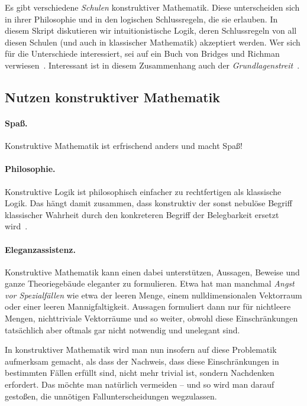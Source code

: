 \documentclass[a4paper,ngerman,12pt]{scrartcl}
\theoremstyle{definition}
\theoremstyle{plain}
\theoremstyle{remark}
\renewcommand{\_}{\mathpunct{.}\,}
\newcommand{\?}{\,{:}\,}
\begin{document}
Es gibt verschiedene \emph{Schulen} konstruktiver Mathematik. Diese
unterscheiden sich in ihrer Philosophie und in den logischen Schlussregeln, die
sie erlauben. In diesem Skript diskutieren wir intuitionistische Logik, deren
Schlussregeln von all diesen Schulen (und auch in klassischer Mathematik)
akzeptiert werden. Wer sich für die Unterschiede interessiert, sei auf ein Buch
von Bridges und Richman verwiesen~\cite{bridges:richman:varieties}. Interessant
ist in diesem Zusammenhang auch der \emph{Grundlagenstreit}~\cite{dalen:frogs}.


\subsection{Nutzen konstruktiver Mathematik}

\paragraph{Spaß.} Konstruktive Mathematik ist erfrischend anders und macht Spaß!

\paragraph{Philosophie.}
Konstruktive Logik ist philosophisch einfacher zu rechtfertigen als
klassische Logik. Das hängt damit zusammen, dass konstruktiv der sonst nebulöse
Begriff klassischer Wahrheit durch den konkreteren Begriff der Belegbarkeit
ersetzt wird~\cite{dummett:basis}.

\paragraph{Eleganzassistenz.}
Konstruktive Mathematik kann einen dabei unterstützen, Aussagen, Beweise und
ganze Theoriegebäude eleganter zu formulieren. Etwa hat man manchmal
\emph{Angst vor Spezialfällen} wie etwa der leeren Menge, einem
nulldimensionalen Vektorraum oder einer leeren Mannigfaltigkeit. Aussagen
formuliert dann nur für nichtleere Mengen, nichttriviale Vektorräume und so
weiter, obwohl diese Einschränkungen tatsächlich aber oftmals gar nicht
notwendig und unelegant sind.

In konstruktiver Mathematik wird man nun insofern auf diese Problematik
aufmerksam gemacht, als dass der Nachweis, dass diese Einschränkungen in
bestimmten Fällen erfüllt sind, nicht mehr trivial ist, sondern Nachdenken
erfordert. Das möchte man natürlich vermeiden -- und so wird man darauf
gestoßen, die unnötigen Fallunterscheidungen wegzulassen.
\end{document}
